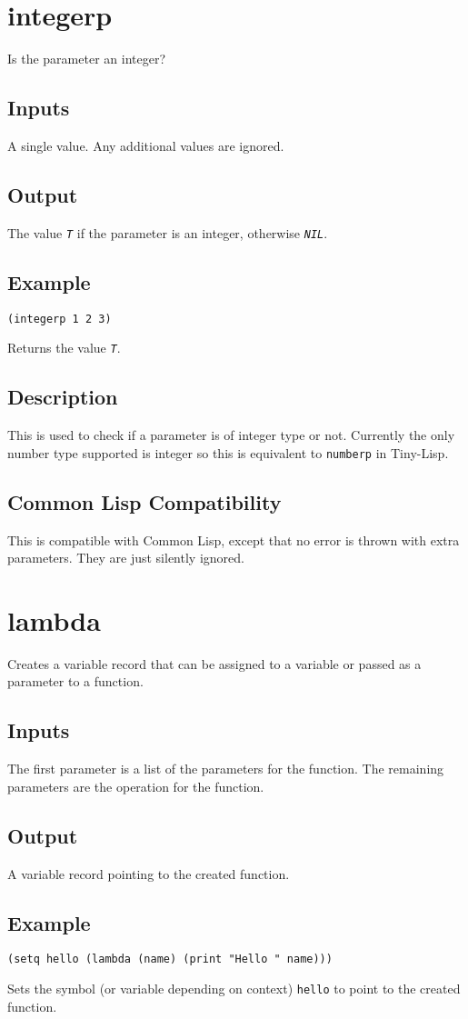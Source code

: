\documentclass[10pt, openany]{book}
\newcommand{\constant}[1]{\emph{\texttt{#1}}}
\newcommand{\keyword}[1]{\texttt{#1}}
\newcommand{\tl}{Tiny-Lisp}
\newcommand{\cl}{Common Lisp}
\begin{document}
\section{integerp}
Is the parameter an integer?
\subsection{Inputs}
A single value.  Any additional values are ignored.
\subsection{Output}
The value \constant{T} if the parameter is an integer, otherwise \constant{NIL}.
\subsection{Example}
\begin{lstlisting}
(integerp 1 2 3)
\end{lstlisting}
Returns the value \constant{T}.
\subsection{Description}
This is used to check if a parameter is of integer type or not.  Currently the only number type supported is integer so this is equivalent to \keyword{numberp} in \tl.
\subsection{Common Lisp Compatibility}
This is compatible with \cl, except that no error is thrown with extra parameters.  They are just silently ignored.

\section{lambda}
Creates a variable record that can be assigned to a variable or passed as a parameter to a function.
\subsection{Inputs}
The first parameter is a list of the parameters for the function.  The remaining parameters are the operation for the function.
\subsection{Output}
A variable record pointing to the created function.
\subsection{Example}
\begin{lstlisting}
(setq hello (lambda (name) (print "Hello " name)))
\end{lstlisting}
Sets the symbol (or variable depending on context) \keyword{hello} to point to the created function.
\end{document}

